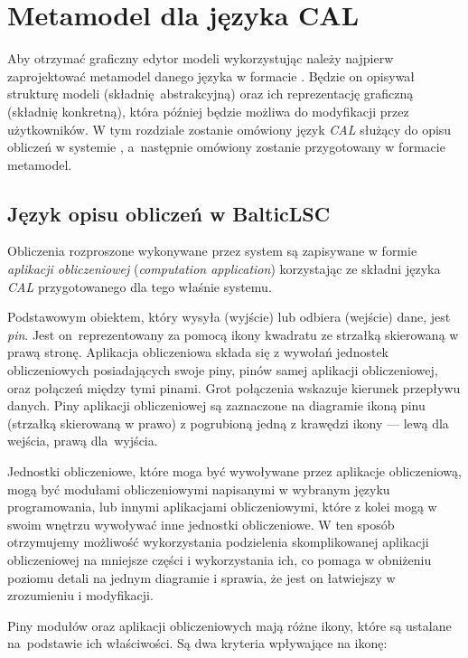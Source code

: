 \chapter{Metamodel dla języka CAL}\label{chapter:cal-metamodel}

Aby otrzymać graficzny edytor modeli wykorzystując \SiriusWeb{} należy
najpierw zaprojektować metamodel danego języka w formacie \Ecore{}. Będzie on
opisywał strukturę modeli (składnię abstrakcyjną) oraz ich
reprezentację graficzną (składnię konkretną), która później będzie możliwa do
modyfikacji przez użytkowników. W tym rozdziale
zostanie omówiony język \emph{\acrfull{CAL}} służący do opisu obliczeń w
systemie \BalticLSC{}, a~następnie omówiony zostanie przygotowany w formacie
\Ecore{} metamodel.

\section{Język opisu obliczeń w BalticLSC}

Obliczenia rozproszone wykonywane przez system \BalticLSC{} są zapisywane w
formie \emph{aplikacji obliczeniowej}
(\emph{computation application})
korzystając ze składni języka \emph{\acrfull{CAL}} przygotowanego dla tego
właśnie systemu.

Podstawowym obiektem, który wysyła (wyjście)
lub odbiera (wejście) dane, jest \emph{pin}. Jest on~reprezentowany za pomocą
ikony kwadratu ze strzałką skierowaną w prawą stronę. Aplikacja obliczeniowa
składa się z wywołań jednostek obliczeniowych posiadających swoje piny, pinów
samej aplikacji obliczeniowej, oraz połączeń między tymi pinami. Grot
połączenia wskazuje kierunek przepływu danych.
Piny aplikacji obliczeniowej są zaznaczone na
diagramie ikoną pinu (strzałką skierowaną w prawo) z pogrubioną
jedną z krawędzi ikony --- lewą dla wejścia, prawą dla~wyjścia.

Jednostki obliczeniowe, które moga być wywoływane przez aplikacje obliczeniową,
mogą być modułami obliczeniowymi napisanymi w wybranym języku programowania,
lub innymi aplikacjami obliczeniowymi, które z kolei mogą w swoim wnętrzu
wywoływać inne jednostki obliczeniowe. W ten sposób otrzymujemy możliwość
wykorzystania podzielenia skomplikowanej aplikacji obliczeniowej na mniejsze
części i wykorzystania ich, co pomaga w obniżeniu poziomu detali na jednym
diagramie i sprawia, że jest on łatwiejszy w zrozumieniu i modyfikacji.

Piny modułów oraz aplikacji obliczeniowych mają różne ikony, które
są ustalane na~podstawie ich właściwości. Są dwa kryteria wpływające na ikonę:

